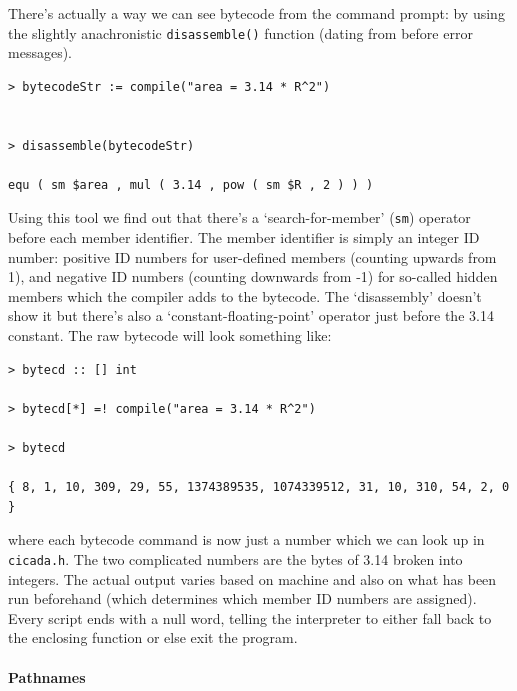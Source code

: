 \documentclass{article}
\newenvironment{code}{
       \begin{list}{}{
               \setlength{\leftmargin}{.4in}
               \setlength{\rightmargin}{0in}
               \setlength{\topsep}{.2in}
       }
       \small
       \item[] }
       { \end{list}   }
\begin{document}
There's actually a way we can see bytecode from the command prompt:  by using the slightly anachronistic \verb#disassemble()# function (dating from before error messages).

\begin{code} \begin{verbatim}
> bytecodeStr := compile("area = 3.14 * R^2")


> disassemble(bytecodeStr)

equ ( sm $area , mul ( 3.14 , pow ( sm $R , 2 ) ) )
\end{verbatim} \end{code}

\noindent Using this tool we find out that there's a `search-for-member' (\verb#sm#) operator before each member identifier.  The member identifier is simply an integer ID number:  positive ID numbers for user-defined members (counting upwards from 1), and negative ID numbers (counting downwards from -1) for so-called hidden members which the compiler adds to the bytecode.  The `disassembly' doesn't show it but there's also a `constant-floating-point' operator just before the 3.14 constant.  The raw bytecode will look something like:

\begin{code} \begin{verbatim}
> bytecd :: [] int

> bytecd[*] =! compile("area = 3.14 * R^2")

> bytecd

{ 8, 1, 10, 309, 29, 55, 1374389535, 1074339512, 31, 10, 310, 54, 2, 0 }
\end{verbatim} \end{code}

\noindent where each bytecode command is now just a number which we can look up in \verb#cicada.h#.  The two complicated numbers are the bytes of 3.14 broken into integers.  The actual output varies based on machine and also on what has been run beforehand (which determines which member ID numbers are assigned).   Every script ends with a null word, telling the interpreter to either fall back to the enclosing function or else exit the program.



\paragraph{Pathnames} 
\end{document}
